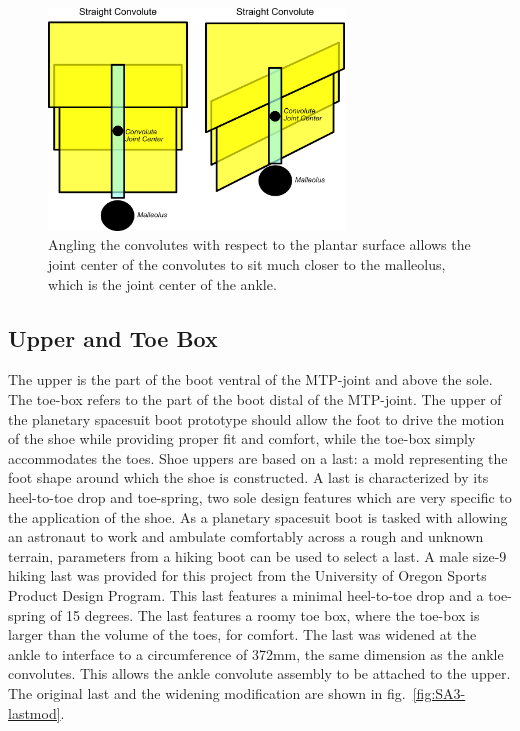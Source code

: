 \documentclass[defaultstyle,11pt]{comps}
\begin{document}
\begin{figure}
\hypertarget{fig:SA3-convolute_ang}{%
\centering
\includegraphics[width=0.7\textwidth,height=\textheight]{../fig/SA3/Convolute_Angled.png}
\caption{Angling the convolutes with respect to the plantar surface allows the joint center of the convolutes to sit much closer to the malleolus, which is the joint center of the ankle.}\label{fig:SA3-convolute_ang}
}
\end{figure}

\hypertarget{upper-and-toe-box}{%
\subsection{Upper and Toe Box}\label{upper-and-toe-box}}

The upper is the part of the boot ventral of the MTP-joint and above the sole.
The toe-box refers to the part of the boot distal of the MTP-joint.
The upper of the planetary spacesuit boot prototype should allow the foot to drive the motion of the shoe while providing proper fit and comfort, while the toe-box simply accommodates the toes.
Shoe uppers are based on a last: a mold representing the foot shape around which the shoe is constructed.
A last is characterized by its heel-to-toe drop and toe-spring, two sole design features which are very specific to the application of the shoe.
As a planetary spacesuit boot is tasked with allowing an astronaut to work and ambulate comfortably across a rough and unknown terrain, parameters from a hiking boot can be used to select a last.
A male size-9 hiking last was provided for this project from the University of Oregon Sports Product Design Program.
This last features a minimal heel-to-toe drop and a toe-spring of 15 degrees.
The last features a roomy toe box, where the toe-box is larger than the volume of the toes, for comfort.
The last was widened at the ankle to interface to a circumference of 372mm, the same dimension as the ankle convolutes.
This allows the ankle convolute assembly to be attached to the upper.
The original last and the widening modification are shown in fig.~\ref{fig:SA3-lastmod}.
\end{document}
